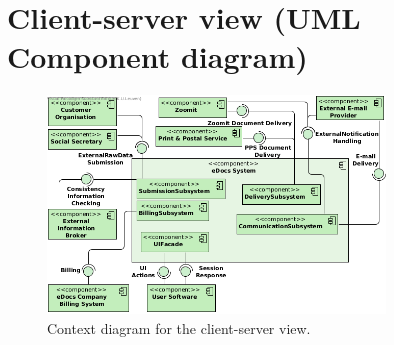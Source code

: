 \section{Client-server view (UML Component diagram)}\label{sec:client-server}

\begin{figure}[!htp]
    \centering
    \includegraphics[width=0.8\textwidth]{figures/Context Diagram 1.png}
    \caption{Context diagram for the client-server view.}\label{fig:cc-context}
\end{figure}

